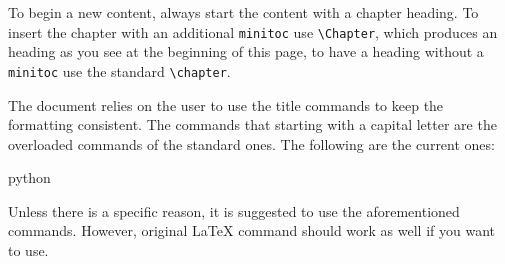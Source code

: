 \documentclass[minted, draw]{../tex/hebdomon}
\begin{document}
\iffalse

To begin a new content, always start the content with a chapter heading. To
insert the chapter with an additional \lstinline[columns=fixed]{minitoc}
use \lstinline[columns=fixed]{\Chapter}, which produces an heading as
you see at the beginning of this page, to have a heading without
a \lstinline[columns=fixed]{minitoc} use the standard
\lstinline[columns=fixed]{\chapter}.

The document relies on the user to use the  title commands to
keep the formatting consistent. The commands that starting with a
capital letter are the overloaded commands of the standard ones.
The following are the current ones:
%
\begin{code}{python}
\end{code}
%
\begin{warning}
	Unless there is a specific reason, it is suggested to use the aforementioned
	commands. However, original LaTeX command should work as well if you want to use.
\end{warning}

\end{document}
